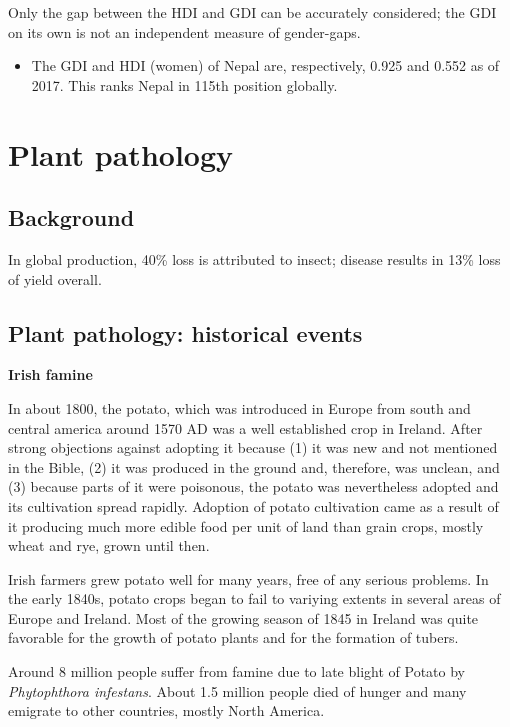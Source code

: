 \documentclass[
]{book}
\providecommand{\tightlist}{%
  \setlength{\itemsep}{0pt}\setlength{\parskip}{0pt}}
\begin{document}
Only the gap between the HDI and GDI can be accurately considered; the GDI on its own is not an independent measure of gender-gaps.

\begin{itemize}
\tightlist
\item
  The GDI and HDI (women) of Nepal are, respectively, 0.925 and 0.552 as of 2017. This ranks Nepal in 115th position globally.
\end{itemize}

\hypertarget{plant-pathology}{%
\chapter{Plant pathology}\label{plant-pathology}}

\hypertarget{background}{%
\section{Background}\label{background}}

In global production, 40\% loss is attributed to insect; disease results in 13\% loss of yield overall.

\hypertarget{plant-pathology-historical-events}{%
\section{Plant pathology: historical events}\label{plant-pathology-historical-events}}

\textbf{Irish famine}

In about 1800, the potato, which was introduced in Europe from south and central america around 1570 AD was a well established crop in Ireland. After strong objections against adopting it because (1) it was new and not mentioned in the Bible, (2) it was produced in the ground and, therefore, was unclean, and (3) because parts of it were poisonous, the potato was nevertheless adopted and its cultivation spread rapidly. Adoption of potato cultivation came as a result of it producing much more edible food per unit of land than grain crops, mostly wheat and rye, grown until then.

Irish farmers grew potato well for many years, free of any serious problems. In the early 1840s, potato crops began to fail to variying extents in several areas of Europe and Ireland. Most of the growing season of 1845 in Ireland was quite favorable for the growth of potato plants and for the formation of tubers.

Around 8 million people suffer from famine due to late blight of Potato by \emph{Phytophthora infestans}. About 1.5 million people died of hunger and many emigrate to other countries, mostly North America.
\end{document}
